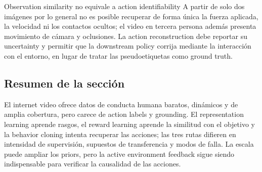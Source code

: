 \begin{warningbox}{Observation similarity no equivale a action identifiability}
A partir de solo dos imágenes por lo general no es posible recuperar de forma única la fuerza aplicada, la velocidad ni los contactos ocultos; el video en tercera persona además presenta movimiento de cámara y oclusiones. La action reconstruction debe reportar su uncertainty y permitir que la downstream policy corrija mediante la interacción con el entorno, en lugar de tratar las pseudoetiquetas como ground truth.
\end{warningbox}


\subsection{Resumen de la sección}

El internet video ofrece datos de conducta humana baratos, dinámicos y de amplia cobertura, pero carece de action labels y grounding. El representation learning aprende rasgos, el reward learning aprende la similitud con el objetivo y la behavior cloning intenta recuperar las acciones; las tres rutas difieren en intensidad de supervisión, supuestos de transferencia y modos de falla. La escala puede ampliar los priors, pero la active environment feedback sigue siendo indispensable para verificar la causalidad de las acciones.
